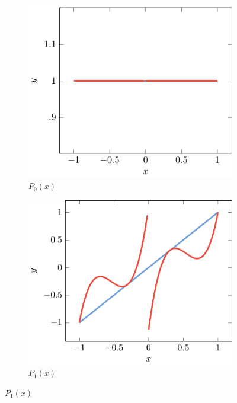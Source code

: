 \documentclass[preprint,12pt]{elsarticle}
\theoremstyle{remark}
\begin{document}
\begin{figure}
    \captionsetup[subfigure]{labelformat=empty, font = footnotesize}
    \centering
    \begin{subfigure}[b]{0.48\textwidth}
        \centering
        \includegraphics[width=\textwidth]{Q3_p=0} 
        \caption{$P_0(x)$}
    \end{subfigure}
    \hfill
    \begin{subfigure}[b]{0.48\textwidth}  
        \centering 
        \includegraphics[width=\textwidth]{Q3_p=1}
        \caption{$P_1(x)$}

\end{subfigure}
\end{figure}
\end{document}
